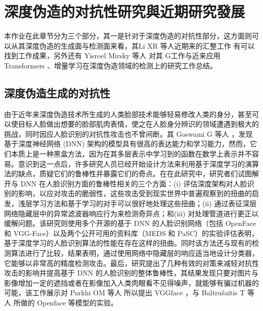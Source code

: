 \chapter{深度伪造的对抗性研究與近期研究發展}
\label{chap:4}

本作业在此章节分为三个部分，其一是针对于深度伪造的对抗性部分，这方面则可以从其深度伪造的生成面与检测面来看，其Li XR 等人近期来的汇整工作\cite{2021496} 有可以找到工作成果，另外还有 Yisroel Mirsky 等人 \cite{DBLP:journals/corr/abs-2004-11138} 对其 G工作与近来应用 Transformers 、增量学习在深度伪造领域的检测上的研究工作总结。


\section{深度伪造生成的对抗性}

由于近年来深度伪造技术所生成的人类脸部技术能够轻易修改人类的身分，甚至可以使目标人脸做出想要的脸部肌肉表情，使之在人脸身分辨识的领域遭遇到极大的挑战，同时因应人脸识别的对抗性攻击也不曾间断。其 Goswami G 等人 \cite{goswami2018unravelling}，发现基于深度神经网络 (DNN) 架构的模型具有很高的表达能力和学习能力，然而，它们本质上是一种黑盒方法，因为在其多层表示中学习到的函数在数学上表示并不容易。意识到这一点后，许多研究人员已经开始设计方法来利用基于深度学习的演算法的缺点，质疑它们的鲁棒性并暴露它们的奇点。在在此研究中，研究者们试图解开与 DNN 在人脸识别方面的鲁棒性相关的三个方面：(i) 评估深度架构对人脸识别的影响，以应对攻击的脆弱性，这些攻击受到现实世界中普遍观察到的扭曲的启发，浅层学习方法和基于学习的对手可以很好地处理这些扭曲；(ii) 通过表征深层网络隐藏层中的异常滤波器响应行为来检测奇异点；和(iii) 对处理管道进行更正以缓解问题。该研究则使用多个开源的基于 DNN 的人脸识别网络（包括 OpenFace 和 VGG-Face）以及两个公开可用的资料库（MEDS 和 PaSC）的实验评估表明，基于深度学习的人脸识别算法的性能在存在这样的扭曲。同时该方法还与现有的检测算法进行了比较，结果表明，通过使用网络中隐藏层的响应适当地设计分类器，它能够以非常高的精度检测攻击。最后，研究提出了几种有效的对策来减轻对抗性攻击的影响并提高基于 DNN 的人脸识别的整体鲁棒性，其结果发现只要对图片与影像增加一定的遮挡或者在影像加入人类肉眼看不见得噪声，就能够有骗过机器的可能，该工作展示对 Parkhi OM 等人 \cite{parkhi2015deep} 所以提出 VGGface ，与 Baltrušaitis T 等人 \cite{baltruvsaitis2016openface} 所做的 Openface 等模型的实验。

